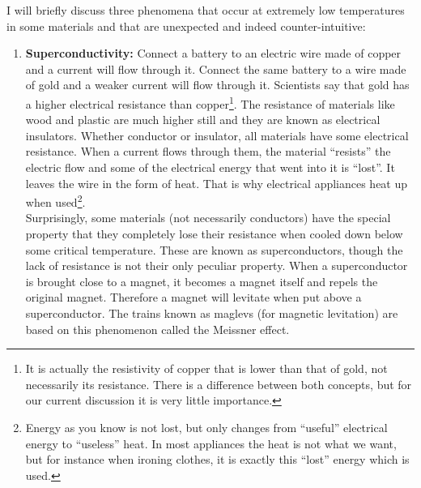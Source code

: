 \noindent I will briefly discuss three phenomena that occur at extremely low temperatures in some materials and that are unexpected and indeed counter-intuitive:
\begin{enumerate}
\item \textbf{Superconductivity: }Connect a battery to an electric wire made of copper and a current will flow through it. Connect the same battery to a wire made of gold and a weaker current will flow through it. Scientists say that gold has a higher electrical resistance than copper\footnote{It is actually the resistivity of copper that is lower than that of gold, not necessarily its resistance. There is a difference between both concepts, but for our current discussion it is very little importance.}. The resistance of materials like wood and plastic are much higher still and they are known as electrical insulators. Whether conductor or insulator, all materials have some electrical resistance. When a current flows through them, the material "`resists"' the electric flow and some of the electrical energy that went into it is "`lost"'. It leaves the wire in the form of heat. That is why electrical appliances heat up when used\footnote{Energy as you know is not lost, but only changes from "`useful"' electrical energy to "`useless"' heat. In most appliances the heat is not what we want, but for instance when ironing clothes, it is exactly this "`lost"' energy which is used.}.\\

\noindent Surprisingly, some materials (not necessarily conductors) have the special property that they completely lose their resistance when cooled down below some critical temperature. These are known as superconductors, though the lack of resistance is not their only peculiar property. When a superconductor is brought close to a magnet, it becomes a magnet itself and repels the original magnet. Therefore a magnet will levitate when put above a superconductor. The trains known as maglevs (for magnetic levitation) are based on this phenomenon called the Meissner effect.\\


\end{enumerate}
